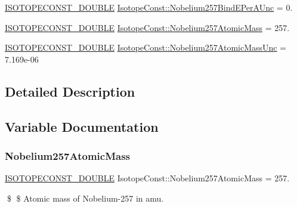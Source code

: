 \begin{DoxyCompactItemize}
\mbox{\hyperlink{group___isotope_const-_macros_ga8f45a7272ce02c0b4c65c44636ed719a}{I\+S\+O\+T\+O\+P\+E\+C\+O\+N\+S\+T\+\_\+\+D\+O\+U\+B\+LE}} \mbox{\hyperlink{group___isotope_const-_nobelium-_no257_gad4c904609989854ab0fbd3d9b5a830b2}{Isotope\+Const\+::\+Nobelium257\+Bind\+E\+Per\+A\+Unc}} = 0.
\item 
\mbox{\hyperlink{group___isotope_const-_macros_ga8f45a7272ce02c0b4c65c44636ed719a}{I\+S\+O\+T\+O\+P\+E\+C\+O\+N\+S\+T\+\_\+\+D\+O\+U\+B\+LE}} \mbox{\hyperlink{group___isotope_const-_nobelium-_no257_ga07df01de3179ee1c76cd2ca29524d854}{Isotope\+Const\+::\+Nobelium257\+Atomic\+Mass}} = 257.
\item 
\mbox{\hyperlink{group___isotope_const-_macros_ga8f45a7272ce02c0b4c65c44636ed719a}{I\+S\+O\+T\+O\+P\+E\+C\+O\+N\+S\+T\+\_\+\+D\+O\+U\+B\+LE}} \mbox{\hyperlink{group___isotope_const-_nobelium-_no257_ga85c5dcfb95fad08672f94e879152c2eb}{Isotope\+Const\+::\+Nobelium257\+Atomic\+Mass\+Unc}} = 7.\+169e-\/06
\end{DoxyCompactItemize}


\subsection{Detailed Description}


\subsection{Variable Documentation}
\mbox{\label{group___isotope_const-_nobelium-_no257_ga07df01de3179ee1c76cd2ca29524d854}} 
\subsubsection{\texorpdfstring{Nobelium257\+Atomic\+Mass}{Nobelium257AtomicMass}}
{\footnotesize\ttfamily \mbox{\hyperlink{group___isotope_const-_macros_ga8f45a7272ce02c0b4c65c44636ed719a}{I\+S\+O\+T\+O\+P\+E\+C\+O\+N\+S\+T\+\_\+\+D\+O\+U\+B\+LE}} Isotope\+Const\+::\+Nobelium257\+Atomic\+Mass = 257.}

\$ \$ Atomic mass of Nobelium-\/257 in amu. \mbox{\label{group___isotope_const-_nobelium-_no257_ga85c5dcfb95fad08672f94e879152c2eb}} 
